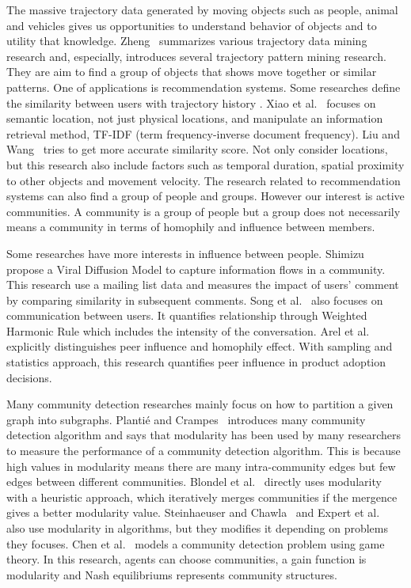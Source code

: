 \documentclass{article}
\begin{document}
The massive trajectory data generated by moving objects such as people, animal and vehicles gives us opportunities to understand behavior of objects and to utility that knowledge. Zheng~ summarizes various trajectory data mining research and, especially, introduces several trajectory pattern mining research. They are aim to find a group of objects that shows move together or similar patterns. One of applications is recommendation systems. Some researches define the similarity between users with trajectory history \cite{Xiao2014,Liu2016}. Xiao et al.~ focuses on semantic location, not just physical locations, and manipulate an information retrieval method, TF-IDF (term frequency-inverse document frequency). Liu and Wang~ tries to get more accurate similarity score. Not only consider locations, but this research also include factors such as temporal duration, spatial proximity to other objects and movement velocity. The research related to recommendation systems can also find a group of people and groups. However our interest is active communities. A community is a group of people but a group does not necessarily means a community in terms of homophily and influence between members.

Some researches have more interests in influence between people. Shimizu~ propose a Viral Diffusion Model to capture information flows in a community. This research use a mailing list data and measures the impact of users' comment by comparing similarity in subsequent comments. Song et al.~ also focuses on communication between users. It quantifies relationship through Weighted Harmonic Rule which includes the intensity of the conversation. Arel et al.~ explicitly distinguishes peer influence and homophily effect. With sampling and statistics approach, this research quantifies peer influence in product adoption decisions.

Many community detection researches mainly focus on how to partition a given graph into subgraphs. Planti{\'e} and Crampes~ introduces many community detection algorithm and says that modularity has been used by many researchers to measure the performance of a community detection algorithm. This is because high values in modularity means there are many intra-community edges but few edges between different communities. Blondel et al.~ directly uses modularity with a heuristic approach, which iteratively merges communities if the mergence gives a better modularity value. Steinhaeuser and Chawla~ and Expert et al.~ also use modularity in algorithms, but they modifies it depending on problems they focuses. Chen et al.~ models a community detection problem using game theory. In this research, agents can choose communities, a gain function is modularity and Nash equilibriums represents community structures.
\end{document}
